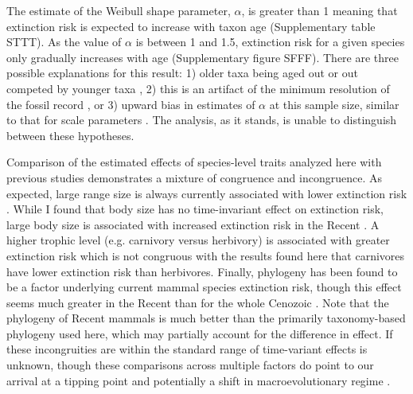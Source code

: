 \documentclass[12pt]{article}
\begin{document}
The estimate of the Weibull shape parameter, $\alpha$, is greater than 1 meaning that extinction risk is expected to increase with taxon age (Supplementary table STTT). As the value of $\alpha$ is between 1 and 1.5, extinction risk for a given species only gradually increases with age (Supplementary figure SFFF). There are three possible explanations for this result: 1) older taxa being aged out or out competed by younger taxa \cite{Wagner2014b}, 2) this is an artifact of the minimum resolution of the fossil record \cite{Sepkoski1975}, or 3) upward bias in estimates of $\alpha$ at this sample size, similar to that for scale parameters \cite{Gelman2013d}. The analysis, as it stands, is unable to distinguish between these hypotheses.

Comparison of the estimated effects of species-level traits analyzed here with previous studies demonstrates a mixture of congruence and incongruence. As expected, large range size is always currently associated with lower extinction risk \cite{Fritz2009,Fritz2010b,Liow2009,Purvis2000a}. While I found that body size has no time-invariant effect on extinction risk, large body size is associated with increased extinction risk in the Recent \cite{Liow2009,Fritz2009,Purvis2000a}. A higher trophic level (e.g. carnivory versus herbivory) is associated with greater extinction risk \cite{Purvis2000a} which is not congruous with the results found here that carnivores have lower extinction risk than herbivores. Finally, phylogeny has been found to be a factor underlying current mammal species extinction risk, though this effect seems much greater in the Recent than for the whole Cenozoic \cite{Fritz2010b}. Note that the phylogeny of Recent mammals is much better than the primarily taxonomy-based phylogeny used here, which may partially account for the difference in effect. If these incongruities are within the standard range of time-variant effects is unknown, though these comparisons across multiple factors do point to our arrival at a tipping point \cite{Barnosky2012a,Barnosky2011} and potentially a shift in macroevolutionary regime \cite{Jablonski1986}.
\end{document}
